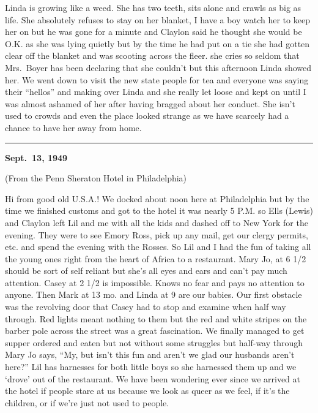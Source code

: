 \documentclass[]{book}
\begin{document}
Linda is growing like a weed. She has two teeth, sits alone and crawls as big as life. She absolutely refuses to stay on her blanket, I have a boy watch her to keep her on but he was gone for a minute and Claylon said he thought she would be O.K. as she was lying quietly but by the time he had put on a tie she
had gotten clear off the blanket and was scooting across the fleer. she cries so seldom that Mrs.~Boyer has been declaring that she couldn't but this afternoon Linda showed her. We went down to visit the new state people for tea and everyone was saying their ``hellos'' and making over Linda and she really let loose and kept on until I was almost ashamed of her after having bragged about her conduct. She isn't used to crowds and even the place looked strange as we have scarcely had a chance to have her away from home.

\begin{center}\rule{0.5\linewidth}{\linethickness}\end{center}

\textbf{Sept.~13, 1949}

(From the Penn Sheraton Hotel in Philadelphia)

Hi from good old U.S.A.! We docked about noon here at Philadelphia but by the time we finished customs and got to the hotel it was nearly 5 P.M. so Ells (Lewis) and Claylon left Lil and me with all the kids and dashed off to New York for the evening. They were to see Emory Ross, pick up any mail, get our clergy permits, etc. and spend the evening with the Rosses. So Lil and I had the fun of taking all the young ones right from the heart of Africa to a restaurant. Mary Jo, at 6 1/2 should be sort of self reliant but she's all eyes and ears and can't pay much attention. Casey at 2 1/2 is impossible. Knows no fear and pays no attention to anyone. Then Mark at 13 mo. and Linda at 9 are our babies. Our first obstacle was the revolving door that Casey had to stop and examine when half way through. Red lights meant nothing to them but the red and white stripes on the barber pole across the street was a great fascination. We finally managed to get supper ordered and eaten but not without some struggles but half-way through Mary Jo says, ``My, but isn't this fun and aren't we glad our husbands aren't here?'' Lil has harnesses for both little boys so she harnessed them up and we `drove' out of the restaurant. We have been wondering ever since we arrived at the hotel if people stare at us because we look as queer as we feel, if it's the children, or if we're just not used to people.
\end{document}
